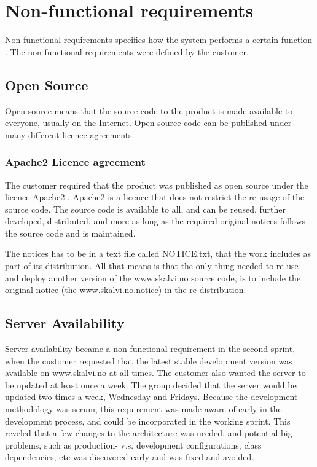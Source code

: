 \section{Non-functional requirements}
Non-functional requirements specifies how the system performs a certain function \cite{requirements}. The non-functional requirements were defined by the customer.


\subsection{Open Source}
Open source means that the source code to the product is made available to everyone, usually on the Internet. Open source code can be published under many different licence agreements.

\subsubsection{Apache2 Licence agreement}
The customer required that the product was published as open source under the licence Apache2 \cite{apache2}. Apache2 is a licence that does not restrict the re-usage of the source code. The source code is available to all, and can be reused, further developed, distributed, and more as long as the required original notices follows the source code and is maintained. 

The notices has to be in a text file called NOTICE.txt, that the work includes as part of its distribution. All that means is that the only thing needed to re-use and deploy another version of the www.skalvi.no source code, is to include the original notice (the www.skalvi.no.notice) in the re-distribution.


\subsection{Server Availability}
Server availability became a non-functional requirement in the second sprint, when the customer requested that the latest stable development version was available on www.skalvi.no at all times. The customer also wanted the server to be updated at least once a week. The group decided that the server would be updated two times a week, Wednesday and Fridays. Because the development methodology was scrum, this requirement was made aware of early in the  development process, and could be incorporated in the working sprint. This reveled that a few changes to the architecture was needed. and potential big problems, such as production- v.s. development configurations, class dependencies, etc  was discovered early and was fixed and avoided.

